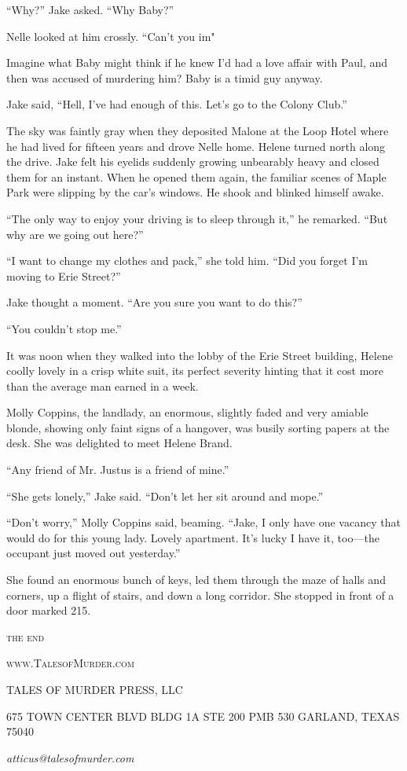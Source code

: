 \documentclass{novel}
\begin{document}
“Why?” Jake asked. “Why Baby?”

Nelle looked at him crossly. “Can’t you im"

Imagine what Baby might think if he knew I’d had a love affair with Paul, and then was accused of murdering him? Baby is a timid guy anyway.

Jake said, “Hell, I've had enough of this. Let’s go to the Colony Club.”

The sky was faintly gray when they deposited Malone at the Loop Hotel where he had lived for fifteen years and drove Nelle home. Helene turned north along the drive. Jake felt his eyelids suddenly growing unbearably heavy and closed them for an instant. When he opened them again, the familiar scenes of Maple Park were slipping by the car’s windows. He shook and blinked himself awake.

“The only way to enjoy your driving is to sleep through it,” he remarked. “But why are we going out here?”

“I want to change my clothes and pack,” she told him. “Did you forget I’m moving to Erie Street?”

Jake thought a moment. “Are you sure you want to do this?”

“You couldn’t stop me.”

It was noon when they walked into the lobby of the Erie Street building, Helene coolly lovely in a crisp white suit, its perfect severity hinting that it cost more than the average man earned in a week.

Molly Coppins, the landlady, an enormous, slightly faded and very amiable blonde, showing only faint signs of a hangover, was busily sorting papers at the desk. She was delighted to meet Helene Brand.

“Any friend of Mr. Justus is a friend of mine.”

“She gets lonely,” Jake said. “Don’t let her sit around and mope.”

“Don’t worry,” Molly Coppins said, beaming. “Jake, I only have one vacancy that would do for this young lady. Lovely apartment. It’s lucky I have it, too—the occupant just moved out yesterday.”

She found an enormous bunch of keys, led them through the maze of halls and corners, up a flight of stairs, and down a long corridor. She stopped in front of a door marked 215.


\scenebreak
\scenebreak
{\centering\textsc{the end}\par}

\clearpage

\null

\centering\textsc{www.TalesofMurder.com}\par

\vspace*{10\nbs}


TALES OF MURDER PRESS, LLC

\null

\scshape{675 TOWN CENTER BLVD
BLDG 1A STE 200 PMB 530
GARLAND, TEXAS 75040}

\null

\textit{atticus@talesofmurder.com}
\vfill
\end{document}
